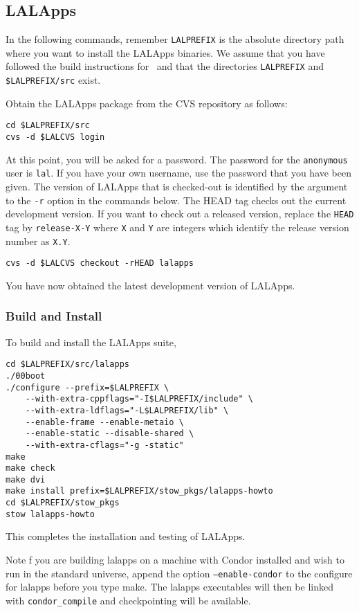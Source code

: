\color{black}
\subsection{LALApps}
\color{black}

In the following commands, remember \verb+LALPREFIX+ is the absolute
directory path where you want to install the LALApps binaries.  We
assume that you have followed the build instructions for \lal\ and
that the directories \verb+LALPREFIX+ and \verb+$LALPREFIX/src+ exist.

Obtain the LALApps package from the CVS repository as follows:  
\begin{verbatim}
cd $LALPREFIX/src
cvs -d $LALCVS login
\end{verbatim}
At this point,  you will be asked for a password.  The password for the
\verb+anonymous+ user is \verb+lal+. If you have your own username, use the
password that you have been given.
The version of LALApps that is checked-out is identified by the argument
to the \texttt{-r} option in the commands below.   The HEAD tag checks out the
current development version.  If you want to check out a released
version, replace the \verb+HEAD+ tag by \verb+release-X-Y+ where
\verb+X+ and \verb+Y+ are integers which identify the release version
number as \verb+X.Y+.
\begin{verbatim}
cvs -d $LALCVS checkout -rHEAD lalapps
\end{verbatim}
You have now obtained the latest development version of LALApps.

\subsubsection{Build and Install}
To build and install the LALApps suite, 
\begin{verbatim}
cd $LALPREFIX/src/lalapps
./00boot
./configure --prefix=$LALPREFIX \
    --with-extra-cppflags="-I$LALPREFIX/include" \
    --with-extra-ldflags="-L$LALPREFIX/lib" \
    --enable-frame --enable-metaio \
    --enable-static --disable-shared \
    --with-extra-cflags="-g -static"
make
make check
make dvi
make install prefix=$LALPREFIX/stow_pkgs/lalapps-howto
cd $LALPREFIX/stow_pkgs
stow lalapps-howto
\end{verbatim}
This completes the installation and testing of LALApps.  

Note f you are building lalapps on a machine with Condor installed and wish to
run in the standard universe, append the option \texttt{--enable-condor} to
the configure for lalapps before you type make. The lalapps executables will
then be linked with \texttt{condor\_compile} and checkpointing will be
available.

